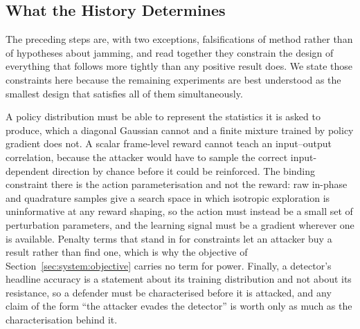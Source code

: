 %
%

\subsection{What the History Determines}
The preceding steps are, with two exceptions, falsifications of method rather than of hypotheses about
jamming, and read together they constrain the design of everything that follows more tightly than any
positive result does.
We state those constraints here because the remaining experiments are best understood as the smallest
design that satisfies all of them simultaneously.

A policy distribution must be able to represent the statistics it is asked to produce, which a
diagonal Gaussian cannot and a finite mixture trained by policy gradient does not.
A scalar frame-level reward cannot teach an input--output correlation, because the attacker would have
to sample the correct input-dependent direction by chance before it could be reinforced.
The binding constraint there is the action parameterisation and not the reward: raw in-phase and
quadrature samples give a search space in which isotropic exploration is uninformative at any reward
shaping, so the action must instead be a small set of perturbation parameters, and the learning signal
must be a gradient wherever one is available.
Penalty terms that stand in for constraints let an attacker buy a result rather than find one, which
is why the objective of Section~\ref{sec:system:objective} carries no term for power.
Finally, a detector's headline accuracy is a statement about its training distribution and not about
its resistance, so a defender must be characterised before it is attacked, and any claim of the form
``the attacker evades the detector'' is worth only as much as the characterisation behind it.

